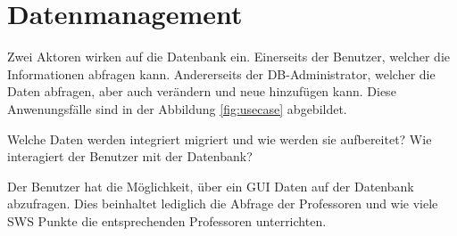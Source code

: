 \section{Datenmanagement}
Zwei Aktoren wirken auf die Datenbank ein. Einerseits der Benutzer, welcher die
Informationen abfragen kann. Andererseits der DB-Administrator, welcher die
Daten abfragen, aber auch verändern und neue hinzufügen kann. Diese
Anwenungsfälle sind in der Abbildung \ref{fig:usecase} abgebildet.


Welche Daten werden integriert migriert
 und wie werden sie 
aufbereitet?
Wie interagiert der Benutzer mit der Datenbank?

Der Benutzer hat die Möglichkeit, über ein GUI Daten auf der Datenbank abzufragen. Dies beinhaltet lediglich die Abfrage der Professoren und wie viele SWS Punkte die entsprechenden Professoren unterrichten.